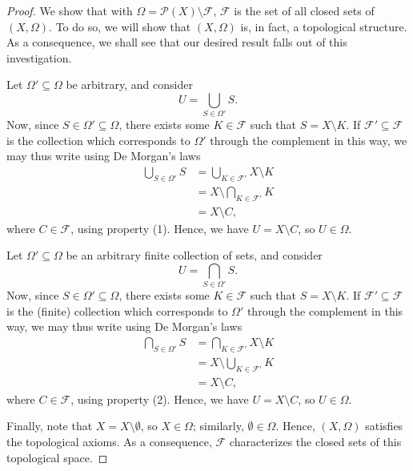 \begin{proof}
    We show that with $\Omega = \mathcal{P}(X) \setminus \mathcal{F}$,
    $\mathcal{F}$ is the set of all closed sets of $(X, \Omega)$.  To do so, we
    will show that $(X, \Omega)$ is, in fact, a topological structure. As a
    consequence, we shall see that our desired result falls out of this
    investigation.

    Let $\Omega' \subseteq \Omega$ be arbitrary, and consider
    \[
        U = \bigcup_{S \in \Omega'} S.
    \]
    Now, since $S \in \Omega' \subseteq \Omega$, there exists some $K \in
    \mathcal{F}$ such that $S = X \setminus K$. If $\mathcal{F}' \subseteq
    \mathcal{F}$ is the collection which corresponds to $\Omega'$ through
    the complement in this way, we may thus write using De Morgan's laws
    \begin{align*}
        \bigcup_{S \in \Omega'} S &= \bigcup_{K \in \mathcal{F}'} X \setminus K
        \\
        &= X \setminus \bigcap_{K \in \mathcal{F}'} K \\
        &= X \setminus C,
    \end{align*}
    where $C \in \mathcal{F}$, using property (1). Hence, we have $U = X
    \setminus C$, so $U \in \Omega$.

    Let $\Omega' \subseteq \Omega$ be an arbitrary finite collection of sets,
    and consider 
    \[
        U = \bigcap_{S \in \Omega'} S.
    \]
    Now, since $S \in \Omega' \subseteq \Omega$, there exists some $K \in
    \mathcal{F}$ such that $S = X \setminus K$. If $\mathcal{F}' \subseteq
    \mathcal{F}$ is the (finite) collection which corresponds to $\Omega'$
    through the complement in this way, we may thus write using De Morgan's laws
    \begin{align*}
        \bigcap_{S \in \Omega'} S &= \bigcap_{K \in \mathcal{F}'} X \setminus K
        \\
        &= X \setminus \bigcup_{K \in \mathcal{F}'} K \\
        &= X \setminus C,
    \end{align*}
    where $C \in \mathcal{F}$, using property (2). Hence, we have $U = X
    \setminus C$, so $U \in \Omega$.

    Finally, note that $X = X \setminus \emptyset$, so $X \in \Omega$;
    similarly, $\emptyset \in \Omega$. Hence, $(X, \Omega)$ satisfies the
    topological axioms. As a consequence, $\mathcal{F}$ characterizes the closed
    sets of this topological space.
\end{proof}

